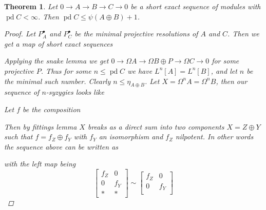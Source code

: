 \documentclass[11pt, a4paper, english]{article}
\newtheorem{theorem}{Theorem}[section]
\theoremstyle{definition}
\DeclareMathOperator{\pd}{pd}
\begin{document}
\begin{theorem}\cite[Theorem~4]{IgTo05} \label{thm:projdim_bounded_by_psi}
	Let $0 \to A \to B \to C \to 0$ be a short exact sequence of modules with $\pd C < \infty$. Then $\pd C \leq \psi(A\oplus B)+1$.
	\begin{proof}
		Let $P_A^\bullet$ and $P_C^\bullet$ be the minimal projective resolutions of $A$ and $C$. Then we get a map of short exact sequences
		\begin{center}
		\end{center}
		Applying the snake lemma we get $0 \to \Omega A \to \Omega B \oplus P \to \Omega C \to 0$ for some projective $P$. Thus for some $n \leq \pd C$ we have $L^n[A] = L^n[B]$, and let $n$ be the minimal such number. Clearly $n \leq \eta_{A\oplus B}$. Let $X = \Omega^n A = \Omega^n B$, then our sequence of $n$-syzygies looks like
		\begin{center}
		\end{center}
		Let $f$ be the composition
		Then by fittings lemma $X$ breaks as a direct sum into two components $X = Z \oplus Y$ such that $f = f_Z \oplus f_Y$ with $f_Y$ an isomorphism and $f_Z$ nilpotent. In other words the sequence above can be written as
		\begin{center}
		\end{center}
		with the left map being
		$$\begin{bmatrix}
			f_Z & 0\\
			0 & f_Y\\
			* & *
		\end{bmatrix} \sim
		\begin{bmatrix}
		f_Z & 0\\
		0 & f_Y\\

\end{bmatrix}$$
\end{proof}
\end{theorem}
\end{document}
